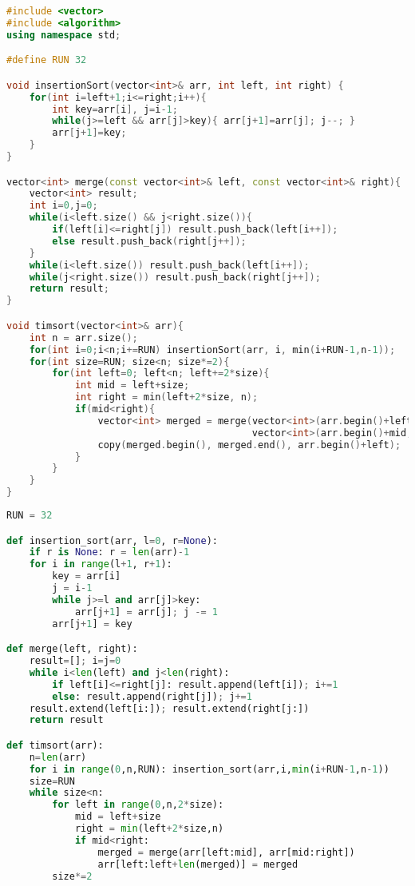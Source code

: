 \begin{lstlisting}[language=C++, caption={Timsort simplificado em C++}, label=code:timSortCpp]
#include <vector>
#include <algorithm>
using namespace std;

#define RUN 32

void insertionSort(vector<int>& arr, int left, int right) {
    for(int i=left+1;i<=right;i++){
        int key=arr[i], j=i-1;
        while(j>=left && arr[j]>key){ arr[j+1]=arr[j]; j--; }
        arr[j+1]=key;
    }
}

vector<int> merge(const vector<int>& left, const vector<int>& right){
    vector<int> result;
    int i=0,j=0;
    while(i<left.size() && j<right.size()){
        if(left[i]<=right[j]) result.push_back(left[i++]);
        else result.push_back(right[j++]);
    }
    while(i<left.size()) result.push_back(left[i++]);
    while(j<right.size()) result.push_back(right[j++]);
    return result;
}

void timsort(vector<int>& arr){
    int n = arr.size();
    for(int i=0;i<n;i+=RUN) insertionSort(arr, i, min(i+RUN-1,n-1));
    for(int size=RUN; size<n; size*=2){
        for(int left=0; left<n; left+=2*size){
            int mid = left+size;
            int right = min(left+2*size, n);
            if(mid<right){
                vector<int> merged = merge(vector<int>(arr.begin()+left, arr.begin()+mid),
                                           vector<int>(arr.begin()+mid, arr.begin()+right));
                copy(merged.begin(), merged.end(), arr.begin()+left);
            }
        }
    }
}
\end{lstlisting}

\begin{lstlisting}[language=Python, caption={Timsort simplificado em Python}, label=code:timSortPy]
RUN = 32

def insertion_sort(arr, l=0, r=None):
    if r is None: r = len(arr)-1
    for i in range(l+1, r+1):
        key = arr[i]
        j = i-1
        while j>=l and arr[j]>key:
            arr[j+1] = arr[j]; j -= 1
        arr[j+1] = key

def merge(left, right):
    result=[]; i=j=0
    while i<len(left) and j<len(right):
        if left[i]<=right[j]: result.append(left[i]); i+=1
        else: result.append(right[j]); j+=1
    result.extend(left[i:]); result.extend(right[j:])
    return result

def timsort(arr):
    n=len(arr)
    for i in range(0,n,RUN): insertion_sort(arr,i,min(i+RUN-1,n-1))
    size=RUN
    while size<n:
        for left in range(0,n,2*size):
            mid = left+size
            right = min(left+2*size,n)
            if mid<right:
                merged = merge(arr[left:mid], arr[mid:right])
                arr[left:left+len(merged)] = merged
        size*=2
\end{lstlisting}

